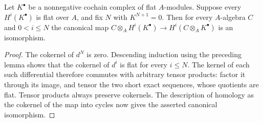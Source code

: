 \begin{theorem}
\label{thm:relative-flat-homology-base-change}
\leanok
Let $K^\bullet$ be a nonnegative cochain complex of flat $A$-modules.
Suppose every $H^i(K^\bullet)$ is flat over $A$, and fix $N$ with
$K^{N+1}=0$. Then for every $A$-algebra $C$ and $0<i\leq N$ the canonical map
$C\otimes_A H^i(K^\bullet)\to H^i(C\otimes_A K^\bullet)$ is an
isomorphism.
\end{theorem}
\begin{proof}
The cokernel of $d^N$ is zero. Descending induction using the preceding
lemma shows that the cokernel of $d^i$ is flat for every $i\leq N$.
The kernel of each such differential therefore commutes with arbitrary tensor products:
factor it through its image, and tensor the two short exact sequences,
whose quotients are flat. Tensor products always preserve cokernels.
The description of homology as the cokernel of the map into cycles now
gives the asserted canonical isomorphism.
\end{proof}


